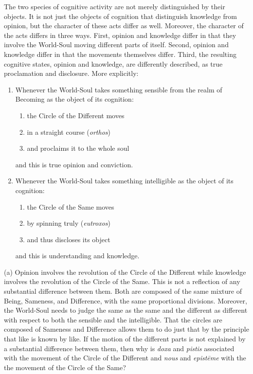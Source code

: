 The two species of cognitive activity are not merely distinguished by their objects. It is not just the objects of cognition that distinguish knowledge from opinion, but the character of these acts differ as well. Moreover, the character of the acts differs in three ways. First, opinion and knowledge differ in that they involve the World-Soul moving different parts of itself. Second, opinion and knowledge differ in that the movements themselves differ. Third, the resulting cognitive states, opinion and knowledge, are differently described, as true proclamation and disclosure. More explicitly:
\begin{enumerate}[(1)]
	\item Whenever the World-Soul takes something sensible from the realm of Becoming as the object of its cognition:
	\begin{enumerate}
		\item the Circle of the Different moves
		\item in a straight course (\emph{orthos})
		\item and proclaims it to the whole soul
	\end{enumerate}
and this is true opinion and conviction.
	\item Whenever the World-Soul takes something intelligible as the object of its cognition:
	\begin{enumerate}
		\item the Circle of the Same moves
		\item by spinning truly (\emph{eutroxos})
		\item and thus discloses its object
	\end{enumerate}
and this is understanding and knowledge.
\end{enumerate}

(a) Opinion involves the revolution of the Circle of the Different while knowledge involves the revolution of the Circle of the Same. This is not a reflection of any substantial difference between them. Both are composed of the same mixture of Being, Sameness, and Difference, with the same proportional divisions. Moreover, the World-Soul needs to judge the same as the same and the different as different with respect to both the sensible and the intelligible. That the circles are composed of Sameness and Difference allows them to do just that by the principle that like is known by like. If the motion of the different parts is not explained by a substantial difference between them, then why is \emph{doxa} and \emph{pistis} associated with the movement of the Circle of the Different and \emph{nous} and \emph{epistēme} with the the movement of the Circle of the Same?

